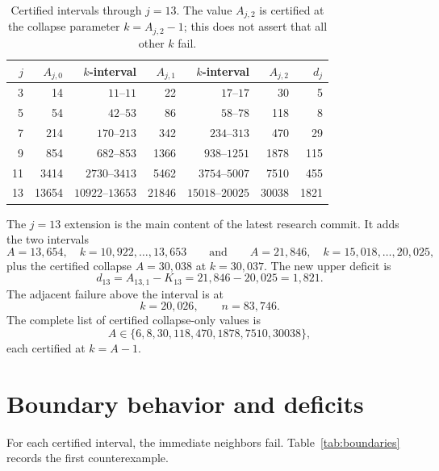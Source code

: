 \documentclass[11pt]{article}
\theoremstyle{remark}
\begin{document}
\begin{table}[h]
\centering
\small
\caption{Certified intervals through \(j=13\). The value \(A_{j,2}\) is certified at the collapse parameter \(k=A_{j,2}-1\); this does not assert that all other \(k\) fail.}
\label{tab:hierarchy}
\begin{tabular}{rrrrrrr}
\toprule
\(j\) & \(A_{j,0}\) & \(k\)-interval & \(A_{j,1}\) & \(k\)-interval & \(A_{j,2}\) & \(d_j\)\\
\midrule
3 & 14 & \(11\)--\(11\) & 22 & \(17\)--\(17\) & 30 & 5\\
5 & 54 & \(42\)--\(53\) & 86 & \(58\)--\(78\) & 118 & 8\\
7 & 214 & \(170\)--\(213\) & 342 & \(234\)--\(313\) & 470 & 29\\
9 & 854 & \(682\)--\(853\) & 1366 & \(938\)--\(1251\) & 1878 & 115\\
11 & 3414 & \(2730\)--\(3413\) & 5462 & \(3754\)--\(5007\) & 7510 & 455\\
13 & 13654 & \(10922\)--\(13653\) & 21846 & \(15018\)--\(20025\) & 30038 & 1821\\
\bottomrule
\end{tabular}
\end{table}

The \(j=13\) extension is the main content of the latest research commit. It adds the two intervals
\[
A=13{,}654,\quad k=10{,}922,\dots,13{,}653
\qquad\text{and}\qquad
A=21{,}846,\quad k=15{,}018,\dots,20{,}025,
\]
plus the certified collapse \(A=30{,}038\) at \(k=30{,}037\). The new upper deficit is
\[
d_{13}=A_{13,1}-K_{13}=21{,}846-20{,}025=1{,}821.
\]
The adjacent failure above the interval is at
\[
k=20{,}026,\qquad n=83{,}746.
\]
The complete list of certified collapse-only values is
\[
A\in\{6,8,30,118,470,1878,7510,30038\},
\]
each certified at \(k=A-1\).

\section{Boundary behavior and deficits}\label{sec:boundaries}

For each certified interval, the immediate neighbors fail. Table~\ref{tab:boundaries} records the first counterexample.
\end{document}
